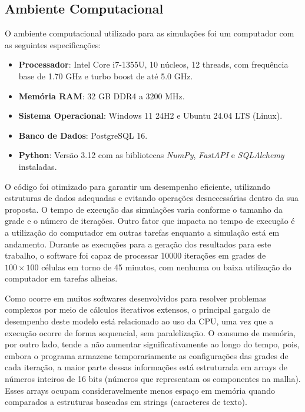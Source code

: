 \documentclass[12pt,oneside]{report}
\begin{document}
\subsection{Ambiente Computacional}

O ambiente computacional utilizado para as simulações foi um computador com as seguintes especificações:
\begin{itemize}
    \item \textbf{Processador}: Intel Core i7-1355U, 10 núcleos, 12 threads, com frequência base de 1.70 GHz e turbo boost de até 5.0 GHz.
    \item \textbf{Memória RAM}: 32 GB DDR4 a 3200 MHz.
    \item \textbf{Sistema Operacional}: Windows 11 24H2 e Ubuntu 24.04 LTS (Linux).
    \item \textbf{Banco de Dados}: PostgreSQL 16.
    \item \textbf{Python}: Versão 3.12 com as bibliotecas \textit{NumPy}, \textit{FastAPI} e \textit{SQLAlchemy} instaladas.
\end{itemize}

O código foi otimizado para garantir um desempenho eficiente, utilizando estruturas de dados adequadas e evitando operações desnecessárias dentro da sua proposta. O tempo de execução das simulações varia conforme o tamanho da grade e o número de iterações. Outro fator que impacta no tempo de execução é a utilização do computador em outras tarefas enquanto a simulação está em andamento. Durante as execuções para a geração dos resultados para este trabalho, o software foi capaz de processar 10000 iterações em grades de $100 \times 100$ células em torno de 45 minutos, com nenhuma ou baixa utilização do computador em tarefas alheias.

Como ocorre em muitos softwares desenvolvidos para resolver problemas complexos por meio de cálculos iterativos extensos, o principal gargalo de desempenho deste modelo está relacionado ao uso da CPU, uma vez que a execução ocorre de forma sequencial, sem paralelização. O consumo de memória, por outro lado, tende a não aumentar significativamente ao longo do tempo, pois, embora o programa armazene temporariamente as configurações das grades de cada iteração, a maior parte dessas informações está estruturada em arrays de números inteiros de 16 bits (números que representam os componentes na malha). Esses arrays ocupam consideravelmente menos espaço em memória quando comparados a estruturas baseadas em strings (caracteres de texto).
\end{document}
